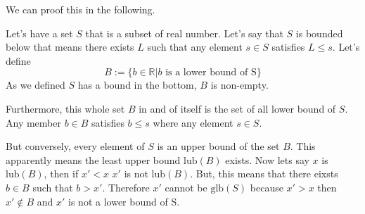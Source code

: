 \documentclass[letter, 12pt]{article}
\begin{document}
We can proof this in the following. 

Let's have a set $S$ that is a subset of real number. Let's say that $S$ is bounded below that means there exists $L$ such that any element $s \in S$ satisfies $L \le  s$. Let's define 
\[
B := \{b \in \mathbb{R} | b \text{ is a lower bound of S}\} 
\] 
As we defined $S$ has a bound in the bottom, $B$ is non-empty. 

Furthermore, this whole set $B$ in and of itself is the set of all lower bound of $S$. Any member $b \in B$ satisfies $b \le s$ where any element $s \in S$. 

But conversely, every element of $S$ is an upper bound of the set $B$. This apparently means the least upper bound $\text{lub}(B)$ exists. Now lets say $x$ is $\text{lub}(B)$, then if $x' < x$ $x'$ is not $\text{lub}(B)$. But, this means that there eixsts $b \in B$ such that $b > x'$. Therefore $x'$ cannot be $\text{glb}(S)$ because $x' > x$ then $x' \not\in B$ and $x'$ is not a lower bound of S.
\end{document}
